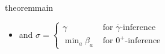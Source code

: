 \documentclass{article}
\newcommand\zogamma{{\bar\gamma}}
\newcommand\otodo[2][]{\todo[color=olicolor!30!white,#1]{#2}}
\begin{document}
\begin{linked}{theorem}{main}
\begin{itemize}[nosep,%
            ]
        \item and $\displaystyle \sigma = \begin{cases}
                {\gamma} & \text{ for $\zogamma$-inference } \\
                {\min_a \beta_a} & \text{ for $0^+\!$-inference }
        \end{cases}$
    \end{itemize}
\end{linked}



\end{document}
